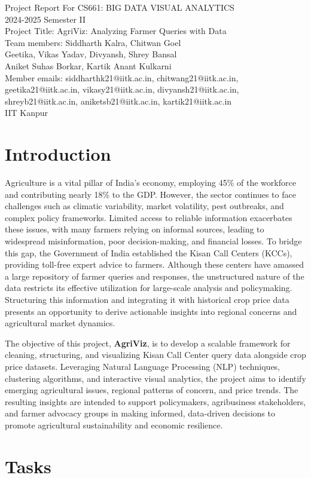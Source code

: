 \documentclass[a4paper, 12pt]{article}
\begin{document}
\begin{center}
Project Report For CS661: BIG DATA VISUAL ANALYTICS\\
2024-2025 Semester II\\
Project Title: AgriViz: Analyzing Farmer Queries with Data \\
\vspace{0.5cm}
Team members: Siddharth Kalra,  Chitwan Goel\\ Geetika, Vikas Yadav, Divyansh, Shrey Bansal\\ Aniket Suhas Borkar,  Kartik Anant Kulkarni\\
\vspace{0.5cm}
Member emails: siddharthk21@iitk.ac.in, chitwang21@iitk.ac.in, geetika21@iitk.ac.in, vikasy21@iitk.ac.in, divyansh21@iitk.ac.in, shreyb21@iitk.ac.in, aniketsb21@iitk.ac.in, kartik21@iitk.ac.in\\
IIT Kanpur
\end{center}
\noindent\section{Introduction}
 
Agriculture is a vital pillar of India's economy, employing 45\% of the workforce and contributing nearly 18\% to the GDP. However, the sector continues to face challenges such as climatic variability, market volatility, pest outbreaks, and complex policy frameworks. Limited access to reliable information exacerbates these issues, with many farmers relying on informal sources, leading to widespread misinformation, poor decision-making, and financial losses. To bridge this gap, the Government of India established the Kisan Call Centers (KCCs), providing toll-free expert advice to farmers. Although these centers have amassed a large repository of farmer queries and responses, the unstructured nature of the data restricts its effective utilization for large-scale analysis and policymaking. Structuring this information and integrating it with historical crop price data presents an opportunity to derive actionable insights into regional concerns and agricultural market dynamics.

The objective of this project, \textbf{AgriViz}, is to develop a scalable framework for cleaning, structuring, and visualizing Kisan Call Center query data alongside crop price datasets. Leveraging Natural Language Processing (NLP) techniques, clustering algorithms, and interactive visual analytics, the project aims to identify emerging agricultural issues, regional patterns of concern, and price trends. The resulting insights are intended to support policymakers, agribusiness stakeholders, and farmer advocacy groups in making informed, data-driven decisions to promote agricultural sustainability and economic resilience.
\noindent\section{Tasks}
\end{document}
